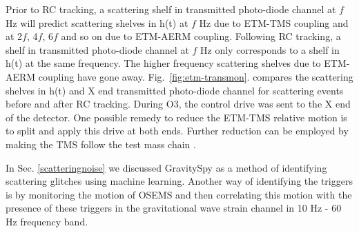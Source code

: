 \documentclass[12pt]{iopart}
\begin{document}
Prior to RC tracking, a scattering shelf in transmitted photo-diode channel at $f$ Hz will predict scattering shelves in h(t) at $f$ Hz due to ETM-TMS coupling and at 2$f$, 4$f$, 6$f$ and so on due to ETM-AERM coupling. Following RC tracking, a shelf in transmitted photo-diode channel at $f$ Hz only corresponds to a shelf in h(t) at the same frequency. The higher frequency scattering shelves due to ETM-AERM coupling have gone away. Fig.~\ref{fig:etm-transmon}.
compares the scattering shelves in h(t) and X end transmitted photo-diode channel for scattering events before and after RC tracking. 
During O3, the control drive was sent to the X end of the detector. One possible remedy to reduce the ETM-TMS relative motion is to split and apply this drive at both ends. Further reduction can be employed by making the TMS follow the test mass chain \cite{alogae_tmsx,alogsid_tmsx}.
\par 

\vspace{0.5cm}
 


In Sec. \ref{scatteringnoise} we discussed GravitySpy as a method of identifying scattering glitches using machine learning.
Another way of identifying the triggers is by monitoring the motion of OSEMS and then correlating this motion with the presence of these triggers in the gravitational wave strain channel in 10 Hz - 60 Hz frequency band.
\end{document}

